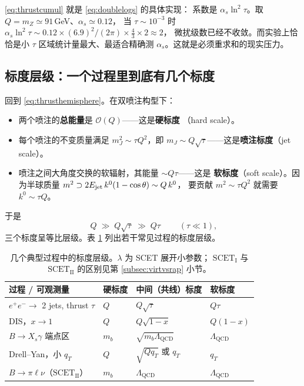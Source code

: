 \documentclass[UTF8,a4paper,11pt]{ctexart}
\theoremstyle{definition}
\theoremstyle{remark}
\theoremstyle{plain}
\newcommand{\as}{\alpha_s}
\newcommand{\LQCD}{\Lambda_{\mathrm{QCD}}}
\newcommand{\SCETI}{\text{SCET}_{\mathrm{I}}}
\newcommand{\SCETII}{\text{SCET}_{\mathrm{II}}}
\newcommand{\en}[1]{\textsf{#1}}   %
\begin{document}
\eqref{eq:thrustcumul} 就是 \eqref{eq:doublelogs} 的具体实现：
系数是 $\as\ln^2\tau$。取 $Q=m_Z\simeq91\,$GeV、$\as\simeq0.12$，
当 $\tau\sim10^{-3}$ 时 $\as\ln^2\tau\sim0.12\times(6.9)^2/(2\pi)\times\tfrac43\times2\approx 2$，
微扰级数已经不收敛。而实验上恰恰是小 $\tau$ 区域统计量最大、最适合精确测
$\as$。这就是必须重求和的现实压力。

\subsection{标度层级：一个过程里到底有几个标度}
\label{subsec:hierarchy}

回到 \eqref{eq:thrusthemisphere}。在双喷注构型下：

\begin{itemize}
  \item 两个喷注的\textbf{总能量}是 $\mathcal O(Q)$——这是\textbf{硬标度}
        （\en{hard scale}）。
  \item 每个喷注的不变质量满足 $m_J^2\sim \tau Q^2$，即
        $m_J\sim Q\sqrt\tau$——这是\textbf{喷注标度}（\en{jet scale}）。
  \item 喷注之间大角度交换的软辐射，其能量 $\sim Q\tau$——这是
        \textbf{软标度}（\en{soft scale}）。因为半球质量
        $m^2 \supset 2E_{\rm jet}\,k^0(1-\cos\theta)\sim Q\,k^0$，
        要贡献 $m^2\sim\tau Q^2$ 就需要 $k^0\sim\tau Q$。
\end{itemize}

于是
\begin{equation}
  \boxed{\;Q\;\gg\;Q\sqrt\tau\;\gg\;Q\tau\;}
  \qquad(\tau\ll1),
\end{equation}
三个标度呈等比层级。表 \ref{tab:processes} 列出若干常见过程的标度层级。

\begin{table}[htbp]
\centering
\caption{几个典型过程中的标度层级。$\lambda$ 为 SCET 展开小参数；
$\SCETI$ 与 $\SCETII$ 的区别见第 \ref{subsec:virtvsrap} 小节。}
\label{tab:processes}
\begin{tabular}{@{}llll@{}}
\toprule
过程 / 可观测量 & 硬标度 & 中间（共线）标度 & 软标度 \\
\midrule
$e^+e^-\to$ 2 jets, thrust $\tau$ & $Q$ & $Q\sqrt\tau$ & $Q\tau$ \\
DIS，$x\to1$                      & $Q$ & $Q\sqrt{1-x}$ & $Q(1-x)$ \\
$B\to X_s\gamma$ 端点区           & $m_b$ & $\sqrt{m_b\LQCD}$ & $\LQCD$ \\
Drell--Yan，小 $q_T$              & $Q$ & $\sqrt{Q q_T}$ 或 $q_T$ & $q_T$ \\
$B\to\pi\ell\nu$（$\SCETII$）      & $m_b$ & $\LQCD$ & $\LQCD$ \\
\bottomrule
\end{tabular}
\end{table}
\end{document}
